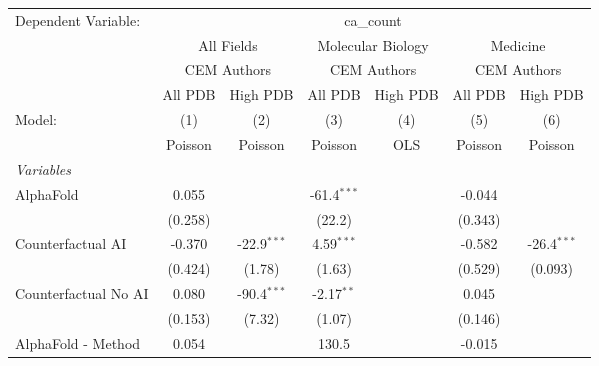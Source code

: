 \begingroup
\centering
\begin{tabular}{lcccccc}
   \tabularnewline \midrule \midrule
   Dependent Variable: & \multicolumn{6}{c}{ca\_count}\\
 & \multicolumn{2}{c}{All Fields} & \multicolumn{2}{c}{Molecular Biology} & \multicolumn{2}{c}{Medicine} \\
\cmidrule(lr){2-3} \cmidrule(lr){4-5} \cmidrule(lr){6-7}
 & \multicolumn{2}{c}{CEM Authors} & \multicolumn{2}{c}{CEM Authors} & \multicolumn{2}{c}{CEM Authors} \\
\cmidrule(lr){2-3} \cmidrule(lr){4-5} \cmidrule(lr){6-7}
 & \multicolumn{1}{c}{All PDB} & \multicolumn{1}{c}{High PDB} & \multicolumn{1}{c}{All PDB} & \multicolumn{1}{c}{High PDB} & \multicolumn{1}{c}{All PDB} & \multicolumn{1}{c}{High PDB} \\
\cmidrule(lr){2-2} \cmidrule(lr){3-3} \cmidrule(lr){4-4} \cmidrule(lr){5-5} \cmidrule(lr){6-6} \cmidrule(lr){7-7}
   Model:                                                     & (1)          & (2)           & (3)           & (4)  & (5)     & (6)\\  
                                                              &  Poisson     & Poisson       & Poisson       & OLS  & Poisson & Poisson\\  
   \midrule
   \emph{Variables}\\
   AlphaFold                                                  & 0.055        &               & -61.4$^{***}$ &      & -0.044  &   \\   
                                                              & (0.258)      &               & (22.2)        &      & (0.343) &   \\   
   Counterfactual AI                                          & -0.370       & -22.9$^{***}$ & 4.59$^{***}$  &      & -0.582  & -26.4$^{***}$\\   
                                                              & (0.424)      & (1.78)        & (1.63)        &      & (0.529) & (0.093)\\   
   Counterfactual No AI                                       & 0.080        & -90.4$^{***}$ & -2.17$^{**}$  &      & 0.045   &   \\   
                                                              & (0.153)      & (7.32)        & (1.07)        &      & (0.146) &   \\   
   AlphaFold - Method                                         & 0.054        &               & 130.5         &      & -0.015  &   \\   

\end{tabular}

